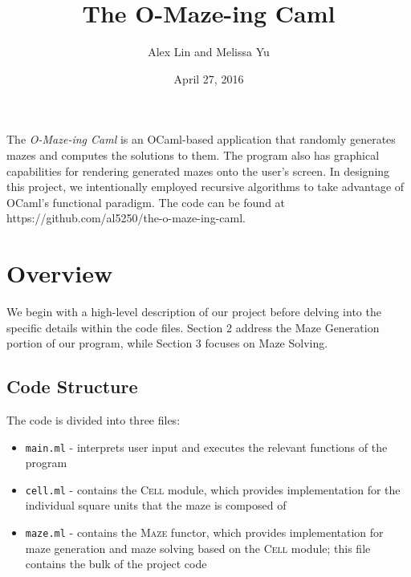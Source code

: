 \documentclass[11pt, margin=1in]{article}
\begin{document}
\title{The O-Maze-ing Caml}
\author{Alex Lin and Melissa Yu}
\date{April 27, 2016}
\maketitle

\setlength\parindent{0pt}

 
The \textit{O-Maze-ing Caml} is an OCaml-based application that randomly generates mazes and computes the solutions to them.  The program also has graphical capabilities for rendering generated mazes onto the user's screen.  In designing this project, we intentionally employed recursive algorithms to take advantage of OCaml's functional paradigm.  The code can be found at https://github.com/al5250/the-o-maze-ing-caml.  

\section{Overview}

We begin with a high-level description of our project before delving into the specific details within the code files.  Section 2 address the Maze Generation portion of our program, while Section 3 focuses on Maze Solving.  

\subsection{Code Structure}  %
The code is divided into three files:
\begin{itemize}
\item \texttt{main.ml} - interprets user input and executes the relevant functions of the program  
\item \texttt{cell.ml} - contains the \textsc{Cell} module, which provides implementation for the individual square units that the maze is composed of
\item \texttt{maze.ml} - contains the \textsc{Maze} functor, which provides implementation for maze generation and maze solving based on the \textsc{Cell} module; this file contains the bulk of the project code   
\end{itemize} 
\end{document}
